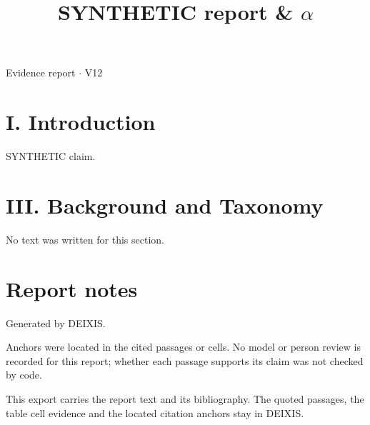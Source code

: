 \documentclass[journal]{IEEEtran}
\begin{document}
\title{SYNTHETIC report \& \ensuremath{\alpha}}

\maketitle

\noindent Evidence report \ensuremath{\cdot} V12

\section*{I. Introduction}

SYNTHETIC claim. \cite{Synth26}

\section*{III. Background and Taxonomy}

No text was written for this section.

\section*{Report notes}

Generated by DEIXIS.

Anchors were located in the cited passages or cells. No model or person review is recorded for this report; whether each passage supports its claim was not checked by code.

This export carries the report text and its bibliography. The quoted passages, the table cell evidence and the located citation anchors stay in DEIXIS.




\end{document}
